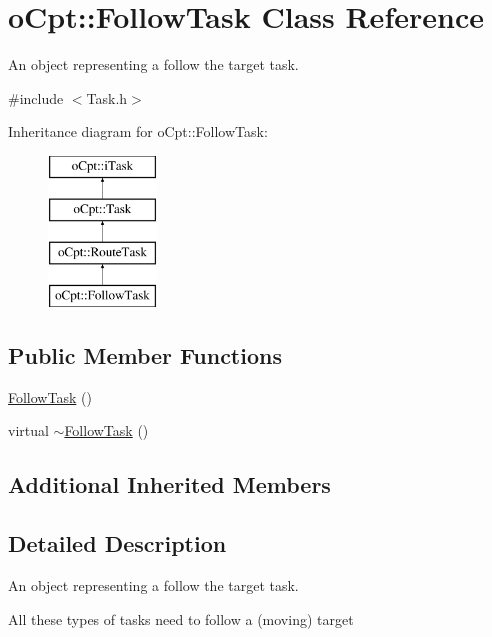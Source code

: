 \hypertarget{classo_cpt_1_1_follow_task}{}\section{o\+Cpt\+:\+:Follow\+Task Class Reference}
\label{classo_cpt_1_1_follow_task}


An object representing a follow the target task.  




{\ttfamily \#include $<$Task.\+h$>$}

Inheritance diagram for o\+Cpt\+:\+:Follow\+Task\+:\begin{figure}[H]
\begin{center}
\leavevmode
\includegraphics[height=4.000000cm]{classo_cpt_1_1_follow_task}
\end{center}
\end{figure}
\subsection*{Public Member Functions}
\begin{DoxyCompactItemize}
\item 
\hyperlink{classo_cpt_1_1_follow_task_a6e7f2d2b4037a331da8d0a994e79090c}{Follow\+Task} ()
\item 
virtual \hyperlink{classo_cpt_1_1_follow_task_ab93d2570c1e65704f6742aa5f3f6a440}{$\sim$\+Follow\+Task} ()
\end{DoxyCompactItemize}
\subsection*{Additional Inherited Members}


\subsection{Detailed Description}
An object representing a follow the target task. 

All these types of tasks need to follow a (moving) target 

